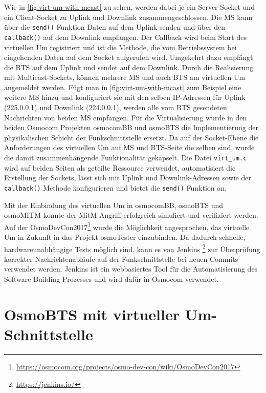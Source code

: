 Wie in \autoref{fig:virt-um-with-mcast} zu sehen, werden dabei je ein Server-Socket und ein Client-Socket zu Uplink und Downlink zusammengeschlossen. Die \ac{MS} kann über die \texttt{send()} Funktion Daten auf dem Uplink senden und über den \texttt{callback()} auf dem Downlink empfangen. Der Callback wird beim Start des virtuellen \ac{Um} registriert und ist die Methode, die vom Betriebssystem bei eingehenden Daten auf dem Socket aufgerufen wird. Umgekehrt dazu empfängt die \ac{BTS} auf dem Uplink und sendet auf dem Downlink. Durch die Realisierung mit Multicast-Sockets, können mehrere \ac{MS} und auch \ac{BTS} am virtuellen \ac{Um} angemeldet werden. Fügt man in \autoref{fig:virt-um-with-mcast} zum Beispiel eine weitere \ac{MS} hinzu und konfiguriert sie mit den selben \ac{IP}-Adressen für Uplink (225.0.0.1) und Downlink (224.0.0.1), werden alle vom \ac{BTS} gesendeten Nachrichten von beiden \ac{MS} empfangen. Für die Virtualisierung wurde in den beiden Osmocom Projekten osmocomBB und osmoBTS die Implementierung der physikalischen Schicht der Funkschnittstelle ersetzt. Da auf der Socket-Ebene die Anforderungen des virtuellen \ac{Um} auf \ac{MS} und \ac{BTS}-Seite die selben sind, wurde die damit zusammenhängende Funktionalität gekapselt. Die Datei \texttt{virt\_um.c} wird auf beiden Seiten als geteilte Ressource verwendet, automatisiert die Erstellung der Sockets, lässt sich mit Uplink und Downlink-Adressen sowie der \texttt{callback()} Methode konfigurieren und bietet die \texttt{send()} Funktion an.

Mit der Einbindung des virtuellen \ac{Um} in osmocomBB, osmoBTS und osmoMITM konnte der \ac{MitM}-Angriff erfolgreich simuliert und verifiziert werden. Auf der OsmoDevCon2017\footnote{\url{https://osmocom.org/projects/osmo-dev-con/wiki/OsmoDevCon2017}} wurde die Möglichkeit angesprochen, das virtuelle \ac{Um} in Zukunft in das Projekt osmoTester einzubinden. Da dadurch schnelle, hardwareunabhängige Tests möglich sind, kann es von Jenkins \footnote{\url{https://jenkins.io/}} zur Überprüfung korrekter Nachrichtenabläufe auf der Funkschnittstelle bei neuen Commits verwendet werden. Jenkins ist ein webbasiertes Tool für die Automatisierung des Software-Building Prozesses und wird dafür in Osmocom verwendet.

\section{OsmoBTS mit virtueller Um-Schnittstelle}

